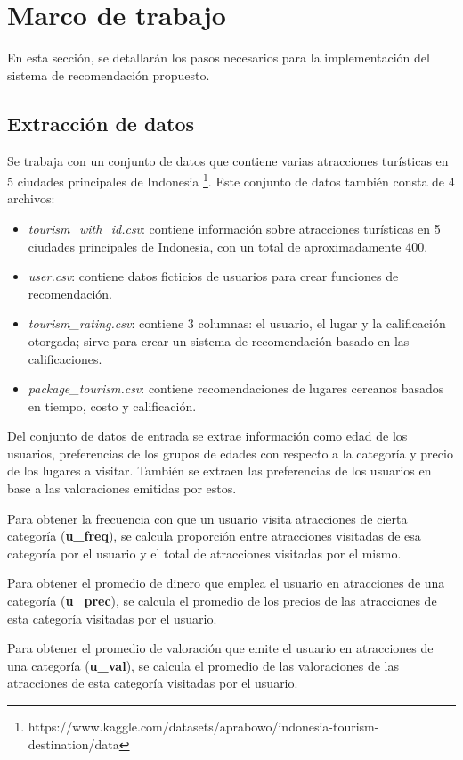 \documentclass[runningheads]{llncs}
\begin{document}
\section{Marco de trabajo}

En esta sección, se detallarán los pasos necesarios para la implementación del sistema de recomendación propuesto.

\subsection{Extracción de datos}
Se trabaja con un conjunto de datos que contiene varias atracciones turísticas en 5 ciudades principales de Indonesia \footnote{https://www.kaggle.com/datasets/aprabowo/indonesia-tourism-destination/data}. Este conjunto de datos también consta de 4 archivos:
\begin{itemize}
    \item \textit{tourism\_with\_id.csv}: contiene información sobre atracciones turísticas en 5 ciudades principales de Indonesia, con un total de aproximadamente 400.
    \item \textit{user.csv}: contiene datos ficticios de usuarios para crear funciones de recomendación.
    \item \textit{tourism\_rating.csv}: contiene 3 columnas: el usuario, el lugar y la calificación otorgada; sirve para crear un sistema de recomendación basado en las calificaciones.
    \item \textit{package\_tourism.csv}: contiene recomendaciones de lugares cercanos basados en tiempo, costo y calificación.
\end{itemize}


Del conjunto de datos de entrada se extrae información como edad de los usuarios, preferencias de los grupos de edades con respecto a la categoría y precio de los lugares a visitar. También se extraen las preferencias de los usuarios en base a las valoraciones emitidas por estos.

Para obtener la frecuencia  con que un usuario visita atracciones de cierta categoría (\textbf{u\_freq}), se calcula proporción entre atracciones visitadas de esa categoría por el usuario y el total de atracciones visitadas por el mismo.

Para obtener el promedio de dinero que emplea el usuario en atracciones de una categoría (\textbf{u\_prec}), se calcula el promedio de los precios de las atracciones de esta categoría visitadas por el usuario.

Para obtener el promedio de valoración que emite el usuario en atracciones de una categoría (\textbf{u\_val}), se calcula el promedio de las valoraciones de las atracciones de esta categoría visitadas por el usuario.
\end{document}
